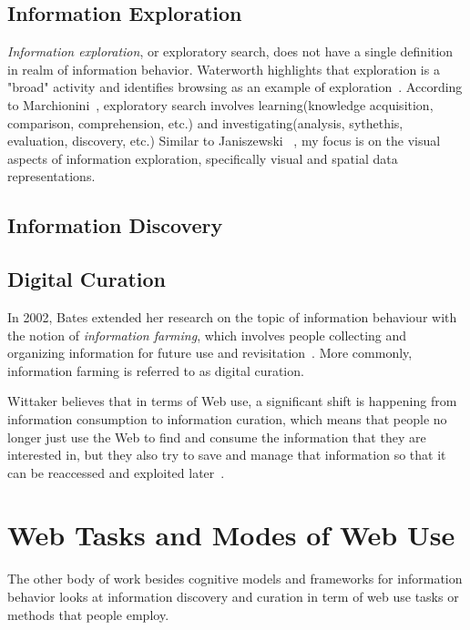 {{\subsection{Information Exploration}
\textit{Information exploration}, or exploratory search, does not have a single definition in realm of information behavior. Waterworth highlights that exploration is a "broad" activity and identifies browsing as an example of exploration~\citep{waterworth1991model}. According to Marchionini~\cite{marchionini2006exploratory}, exploratory search involves learning(knowledge acquisition, comparison, comprehension, etc.) and investigating(analysis, sythethis, evaluation, discovery, etc.) Similar to Janiszewski ~\cite{janiszewski1998influence}, my focus is on the visual aspects of information exploration, specifically visual and spatial data representations.
}

{\subsection{Information Discovery}



}
   
{\subsection{Digital Curation}
In 2002, Bates extended her research on the topic of information behaviour with the notion of \textit{information farming}, which involves people collecting and organizing information for future use and revisitation~\cite{bates2002toward}. More commonly, information farming is referred to as digital curation. 

Wittaker believes that in terms of Web use, a significant shift is happening from information consumption to information curation, which means that people no longer just use the Web to find and consume the information that they are interested in, but they also try to save and manage that information so that it can be reaccessed and exploited later~\cite{whittaker2011personal}. 

{\section{Web Tasks and Modes of Web Use}
The other body of work besides cognitive models and frameworks for information behavior looks at information discovery and curation in term of web use tasks or methods that people employ.

}}}
